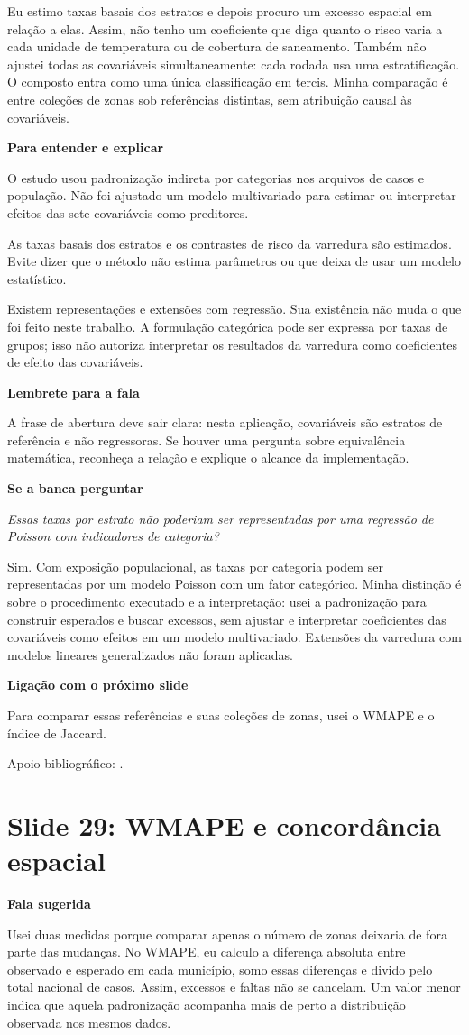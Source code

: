 \documentclass[11pt,a4paper]{article}
\newcommand{\bloco}[1]{\par\Needspace{3\baselineskip}\textbf{#1}\par}
\newcommand{\slide}[2]{\Needspace{12\baselineskip}\section*{Slide #1: #2}\addcontentsline{toc}{section}{Slide #1: #2}}
\begin{document}
Eu estimo taxas basais dos estratos e depois procuro um excesso espacial em relação a elas. Assim, não tenho um coeficiente que diga quanto o risco varia a cada unidade de temperatura ou de cobertura de saneamento. Também não ajustei todas as covariáveis simultaneamente: cada rodada usa uma estratificação. O composto entra como uma única classificação em tercis. Minha comparação é entre coleções de zonas sob referências distintas, sem atribuição causal às covariáveis.
\bloco{Para entender e explicar}
\begin{description}[style=nextline]
\item[A distinção é sobre a aplicação executada] O estudo usou padronização indireta por categorias nos arquivos de casos e população. Não foi ajustado um modelo multivariado para estimar ou interpretar efeitos das sete covariáveis como preditores.
\item[Há estimação, mesmo sem regressão de efeitos] As taxas basais dos estratos e os contrastes de risco da varredura são estimados. Evite dizer que o método não estima parâmetros ou que deixa de usar um modelo estatístico.
\item[Modelos relacionados] Existem representações e extensões com regressão. Sua existência não muda o que foi feito neste trabalho. A formulação categórica pode ser expressa por taxas de grupos; isso não autoriza interpretar os resultados da varredura como coeficientes de efeito das covariáveis.
\end{description}
\bloco{Lembrete para a fala}
A frase de abertura deve sair clara: nesta aplicação, covariáveis são estratos de referência e não regressoras. Se houver uma pergunta sobre equivalência matemática, reconheça a relação e explique o alcance da implementação.
\bloco{Se a banca perguntar}
\emph{Essas taxas por estrato não poderiam ser representadas por uma regressão de Poisson com indicadores de categoria?}

Sim. Com exposição populacional, as taxas por categoria podem ser representadas por um modelo Poisson com um fator categórico. Minha distinção é sobre o procedimento executado e a interpretação: usei a padronização para construir esperados e buscar excessos, sem ajustar e interpretar coeficientes das covariáveis como efeitos em um modelo multivariado. Extensões da varredura com modelos lineares generalizados não foram aplicadas.
\bloco{Ligação com o próximo slide}
Para comparar essas referências e suas coleções de zonas, usei o WMAPE e o índice de Jaccard.
{\small Apoio bibliográfico: \cite{jung2009glm}.\par}
\clearpage
\slide{29}{WMAPE e concordância espacial}
\bloco{Fala sugerida}
Usei duas medidas porque comparar apenas o número de zonas deixaria de fora parte das mudanças. No WMAPE, eu calculo a diferença absoluta entre observado e esperado em cada município, somo essas diferenças e divido pelo total nacional de casos. Assim, excessos e faltas não se cancelam. Um valor menor indica que aquela padronização acompanha mais de perto a distribuição observada nos mesmos dados.
\end{document}
